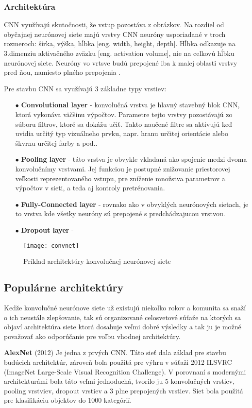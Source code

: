 \subsubsection{Architektúra}
CNN využívajú skutočnosti, že vstup pozostáva z obrázkov.
Na rozdiel od obyčajnej neurónovej siete majú vrstvy CNN neuróny usporiadané v troch rozmeroch: šírka, výška, hĺbka [eng. width, height, depth].
Hĺbka odkazuje na 3.dimenziu aktivačného zväzku [eng. activation volume], nie na celkovú hĺbku neurónovej siete.
Neuróny vo vrtsve budú prepojené iba k malej oblasti vrstvy pred ňou, namiesto plného prepojenia \cite{odkaz:CNNArchitecture}.

Pre stavbu CNN sa využívajú 3 základne typy vrstiev:
\begin{enumerate}
    \item[$\bullet$] \textbf{Convolutional layer} - konvolučná vrstva je hlavný stavebný blok CNN, ktorá vykonáva väčšinu výpočtov.
    Parametre tejto vrstvy pozostávajú zo súboru filtrov, ktoré sa dokážu učiť.
    Takto naučené filtre sa aktivujú keď uvidia určitý typ vizuálneho prvku, napr. hranu určitej orientácie alebo škvrnu určitej farby a pod..
    \item[$\bullet$] \textbf{Pooling layer} - táto vrstva je obvykle vkladaná ako spojenie medzi dvoma konvolučnímy vrstvami.
    Jej funkciou je postupné znižovanie priestorovej veľkosti reprezentovaného vstupu, pre zníženie množstva parametrov a výpočtov v sieti, a teda aj kontroly pretrénovania.
    \item[$\bullet$] \textbf{Fully-Connected layer} - rovnako ako v obvyklých neurónových sietach, je to vrstva kde všetky neuróny sú prepojené s predchádzajucou vrstvou.
    \item[$\bullet$] \textbf{Dropout layer} - %
\end{enumerate}

\begin{figure}[H]
	\centering
	\texttt{[image: convnet]}
	\caption{Príklad architektúry konvolučnej neurónovej siete \cite{odkaz:CNNArchitecture}}
	\label{pic:CNNExample}
\end{figure}

\subsection{Populárne architektúry}
Kedže konvolučné neurónove siete už existujú niekoľko rokov a komunita sa snaží o ich neustále zlepšovanie, tak sú organizované
    celosvetové súťaže na ktorých sa objaví architektúra siete ktorá dosahuje veľmi dobré výsledky a tak ju je možné považovať ako
    odporúčanie pre voľbu vhodnej architektúry.

\textbf{AlexNet} (2012) Je jedna z prvých CNN. Táto sieť dala základ pre stavbu budúcich architektúr, zároveň bola použitá
    pre výhru v súťaži 2012 ILSVRC (ImageNet Large-Scale Visual Recognition Challenge).
V porovnaní s modernými architekturámi bola táto veľmi jednoduchá, tvorilo ju 5 konvolučných vrstiev, pooling vrstviev, dropout vrstiev a 3 plne prepojených vrstiev.
Siet bola použitá pre klasifikáciu objektov do 1000 kategórií.

